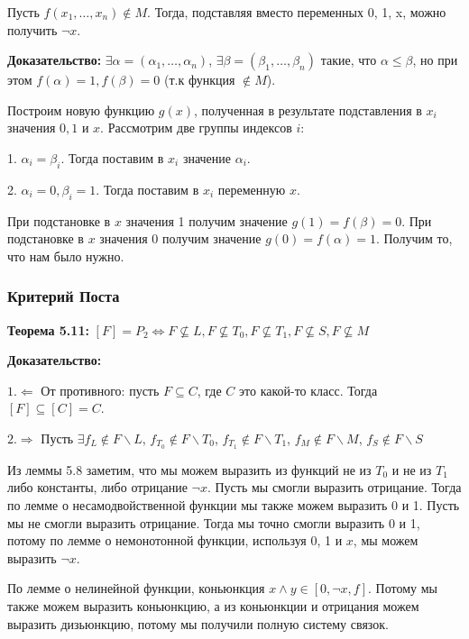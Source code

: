 \documentclass[openany]{article}
\begin{document}
   Пусть $f (x_1, \ldots, x_n) \notin M$. Тогда, подставляя вместо переменных 0, 1, x, можно получить $\neg x$.

   \textbf{Доказательство:} $\exists \alpha = (\alpha_1, \ldots, \alpha_n)$, $\exists \beta = (\beta_1, \ldots, \beta_n)$ такие, что $\alpha \le \beta$, но при этом $f(\alpha) = 1, f(\beta) = 0$ (т.к функция $\notin M$). 

   Построим новую функцию $g(x)$, полученная в результате подставления в $x_i$ значения $0, 1$ и $x$. Рассмотрим две группы индексов $i$: 

   \hspace{0.5cm}\parbox{12cm} {

   1. $\alpha_i = \beta_i$. Тогда поставим в $x_i$ значение $\alpha_i$.

   2. $\alpha_i = 0, \beta_i = 1$. Тогда поставим в $x_i$ переменную $x$.
   }

   При подстановке в $x$ значения 1 получим значение $g(1) = f(\beta) = 0$. При подстановке в $x$ значения 0 получим значение $g(0) = f(\alpha) = 1$. Получим то, что нам было нужно.

   \subsubsection{Критерий Поста}

   \textbf{Теорема 5.11:} $[F] = P_2 \Leftrightarrow F \nsubseteq L, F \nsubseteq T_0, F \nsubseteq T_1, F \nsubseteq S, F \nsubseteq M$

   \textbf{Доказательство:}

   $1. \Leftarrow$ От противного: пусть $F \subseteq C$, где $C$ это какой-то класс. Тогда $[F] \subseteq [C] = C$.

   $2. \Rightarrow$ Пусть $\exists f_L \notin F \backslash L$, $f_{T_0} \notin F \backslash T_0$, $f_{T_1} \notin F \backslash T_1$, $f_M \notin F \backslash M$, $f_S \notin F \backslash S$

   Из леммы 5.8 заметим, что мы можем выразить из функций не из $T_0$ и не из $T_1$ либо константы, либо отрицание $\neg x$. Пусть мы смогли выразить отрицание. Тогда по лемме о несамодвойственной функции мы также можем выразить 0 и 1. Пусть мы не смогли выразить отрицание. Тогда мы точно смогли выразить 0 и 1, потому по лемме о немонотонной функции, используя 0, 1 и $x$, мы можем выразить $\neg x$.

   По лемме о нелинейной функции, коньюнкция $x \wedge y \in [0, \neg x, f]$. Потому мы также можем выразить коньюнкцию, а из коньюнкции и отрицания можем выразить дизьюнкцию, потому мы получили полную систему связок.
\end{document}
